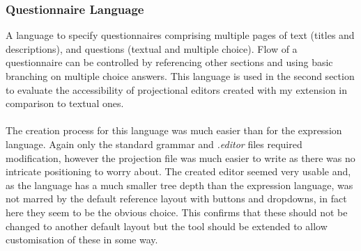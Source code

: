 \documentclass{article}
\begin{document}
{%

\subsubsection{Questionnaire Language}\label{questionnaireLang}
A language to specify questionnaires comprising multiple pages of text (titles and descriptions), and questions (textual and multiple choice). Flow of a questionnaire can be controlled by referencing other sections and using basic branching on multiple choice answers. This language is used in the second section to evaluate the accessibility of projectional editors created with my extension in comparison to textual ones.
\\
\\
The creation process for this language was much easier than for the expression language. Again only the standard grammar and \emph{.editor} files required modification, however the projection file was much easier to write as there was no intricate positioning to worry about. The created editor seemed very usable and, as the language has a much smaller tree depth than the expression language, was not marred by the default reference layout with buttons and dropdowns, in fact here they seem to be the obvious choice. This confirms that these should not be changed to another default layout but the tool should be extended to allow customisation of these in some way.




}
\end{document}
